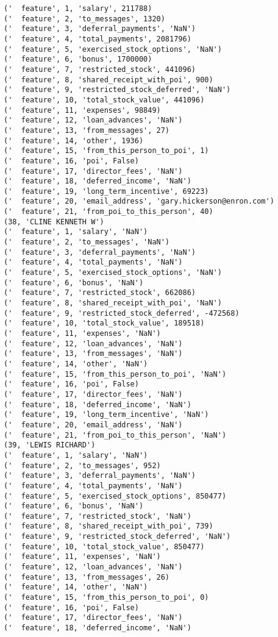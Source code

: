 \begin{verbatim}
('  feature', 1, 'salary', 211788)
('  feature', 2, 'to_messages', 1320)
('  feature', 3, 'deferral_payments', 'NaN')
('  feature', 4, 'total_payments', 2081796)
('  feature', 5, 'exercised_stock_options', 'NaN')
('  feature', 6, 'bonus', 1700000)
('  feature', 7, 'restricted_stock', 441096)
('  feature', 8, 'shared_receipt_with_poi', 900)
('  feature', 9, 'restricted_stock_deferred', 'NaN')
('  feature', 10, 'total_stock_value', 441096)
('  feature', 11, 'expenses', 98849)
('  feature', 12, 'loan_advances', 'NaN')
('  feature', 13, 'from_messages', 27)
('  feature', 14, 'other', 1936)
('  feature', 15, 'from_this_person_to_poi', 1)
('  feature', 16, 'poi', False)
('  feature', 17, 'director_fees', 'NaN')
('  feature', 18, 'deferred_income', 'NaN')
('  feature', 19, 'long_term_incentive', 69223)
('  feature', 20, 'email_address', 'gary.hickerson@enron.com')
('  feature', 21, 'from_poi_to_this_person', 40)
(38, 'CLINE KENNETH W')
('  feature', 1, 'salary', 'NaN')
('  feature', 2, 'to_messages', 'NaN')
('  feature', 3, 'deferral_payments', 'NaN')
('  feature', 4, 'total_payments', 'NaN')
('  feature', 5, 'exercised_stock_options', 'NaN')
('  feature', 6, 'bonus', 'NaN')
('  feature', 7, 'restricted_stock', 662086)
('  feature', 8, 'shared_receipt_with_poi', 'NaN')
('  feature', 9, 'restricted_stock_deferred', -472568)
('  feature', 10, 'total_stock_value', 189518)
('  feature', 11, 'expenses', 'NaN')
('  feature', 12, 'loan_advances', 'NaN')
('  feature', 13, 'from_messages', 'NaN')
('  feature', 14, 'other', 'NaN')
('  feature', 15, 'from_this_person_to_poi', 'NaN')
('  feature', 16, 'poi', False)
('  feature', 17, 'director_fees', 'NaN')
('  feature', 18, 'deferred_income', 'NaN')
('  feature', 19, 'long_term_incentive', 'NaN')
('  feature', 20, 'email_address', 'NaN')
('  feature', 21, 'from_poi_to_this_person', 'NaN')
(39, 'LEWIS RICHARD')
('  feature', 1, 'salary', 'NaN')
('  feature', 2, 'to_messages', 952)
('  feature', 3, 'deferral_payments', 'NaN')
('  feature', 4, 'total_payments', 'NaN')
('  feature', 5, 'exercised_stock_options', 850477)
('  feature', 6, 'bonus', 'NaN')
('  feature', 7, 'restricted_stock', 'NaN')
('  feature', 8, 'shared_receipt_with_poi', 739)
('  feature', 9, 'restricted_stock_deferred', 'NaN')
('  feature', 10, 'total_stock_value', 850477)
('  feature', 11, 'expenses', 'NaN')
('  feature', 12, 'loan_advances', 'NaN')
('  feature', 13, 'from_messages', 26)
('  feature', 14, 'other', 'NaN')
('  feature', 15, 'from_this_person_to_poi', 0)
('  feature', 16, 'poi', False)
('  feature', 17, 'director_fees', 'NaN')
('  feature', 18, 'deferred_income', 'NaN')

\end{verbatim}

